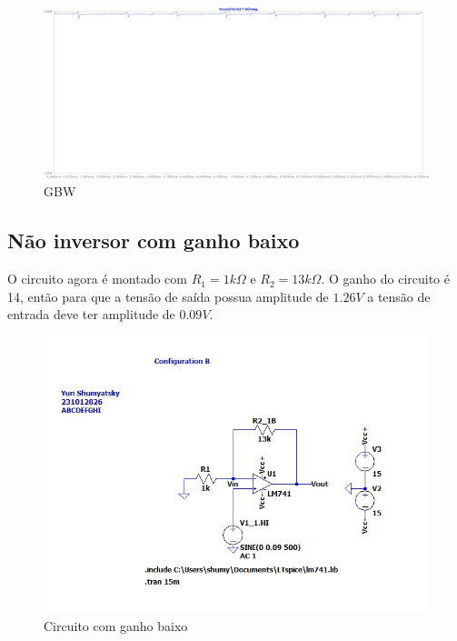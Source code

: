 \documentclass[10pt,twocolumn,letterpaper]{article}
\begin{document}
\begin{figure}[h]
\caption{GBW}
\begin{center}
\includegraphics[scale=0.15]{figuras/fig5}
\end{center}
\end{figure}

\newpage
\subsection{Não inversor com ganho baixo}

O circuito agora é montado com $R_1=1k\Omega$ e $R_2=13k\Omega$. O ganho do circuito é 14, então para que a tensão de saída possua amplitude de $1.26V$ a tensão de entrada deve ter amplitude de $0.09V$.

\begin{figure}[h]
\caption{Circuito com ganho baixo}
\begin{center}
\includegraphics[scale=0.25]{figuras/fig6}
\end{center}
\end{figure}
\end{document}
